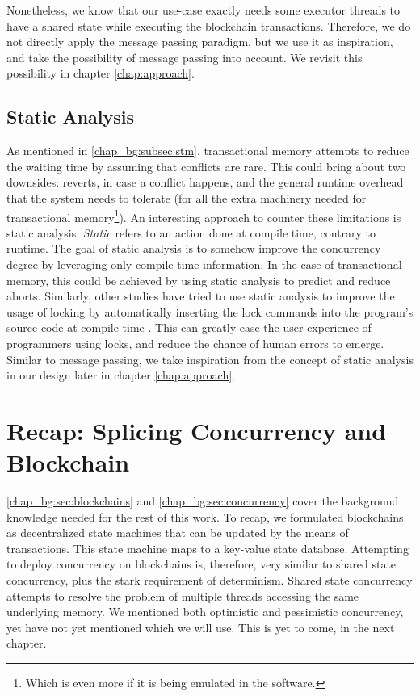 Nonetheless, we know that our use-case exactly needs some executor threads to have a shared state
while executing the blockchain transactions. Therefore, we do not directly apply the message passing
paradigm, but we use it as inspiration, and take the possibility of message passing into account. We
revisit this possibility in chapter \ref{chap:approach}.

\subsection{Static Analysis}

As mentioned in \ref{chap_bg:subsec:stm}, transactional memory attempts to reduce the waiting time
by assuming that conflicts are rare. This could bring about two downsides: reverts, in case a
conflict happens, and the general runtime overhead that the system needs to tolerate (for all the
extra machinery needed for transactional memory\footnote{Which is even more if it is being emulated
in the software.}). An interesting approach to counter these limitations is static analysis.
\textit{Static} refers to an action done at compile time, contrary to runtime. The goal of static
analysis is to somehow improve the concurrency degree by leveraging only compile-time information.
In the case of transactional memory, this could be achieved by using static analysis to predict and
reduce aborts\cite{diasEfficientCorrectTransactional}. Similarly, other studies have tried to use
static analysis to improve the usage of locking by automatically inserting the lock commands into
the program's source code at compile time \cite{cheremInferringLocksAtomic2007}. This can greatly
ease the user experience of programmers using locks, and reduce the chance of human errors to
emerge. Similar to message passing, we take inspiration from the concept of static analysis in our design
later in chapter \ref{chap:approach}.

\section{Recap: Splicing Concurrency and Blockchain}

\ref{chap_bg:sec:blockchains} and \ref{chap_bg:sec:concurrency} cover the background knowledge
needed for the rest of this work. To recap, we formulated blockchains as decentralized state
machines that can be updated by the means of transactions. This state machine maps to a key-value
state database. Attempting to deploy concurrency on blockchains is, therefore, very similar to
shared state concurrency, plus the stark requirement of determinism. Shared state concurrency
attempts to resolve the problem of multiple threads accessing the same underlying memory. We
mentioned both optimistic and pessimistic concurrency, yet have not yet mentioned which we will use.
This is yet to come, in the next chapter.
